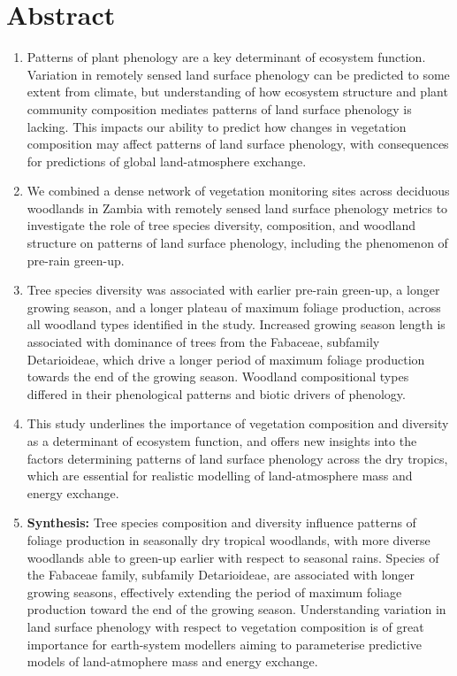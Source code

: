 \documentclass[11pt,a4paper]{article}
\begin{document}
\section*{Abstract}

\begin{enumerate}
	\item{Patterns of plant phenology are a key determinant of ecosystem function. Variation in remotely sensed land surface phenology can be predicted to some extent from climate, but understanding of how ecosystem structure and plant community composition mediates patterns of land surface phenology is lacking. This impacts our ability to predict how changes in vegetation composition may affect patterns of land surface phenology, with consequences for predictions of global land-atmosphere exchange.}
	\item{We combined a dense network of \nSites{} vegetation monitoring sites across deciduous woodlands in Zambia with remotely sensed land surface phenology metrics to investigate the role of tree species diversity, composition, and woodland structure on patterns of land surface phenology, including the phenomenon of pre-rain green-up.} 
	\item{Tree species diversity was associated with earlier pre-rain green-up, a longer growing season, and a longer plateau of maximum foliage production, across all woodland types identified in the study. Increased growing season length is associated with dominance of trees from the Fabaceae, subfamily Detarioideae, which drive a longer period of maximum foliage production towards the end of the growing season. Woodland compositional types differed in their phenological patterns and biotic drivers of phenology. }
	\item{This study underlines the importance of vegetation composition and diversity as a determinant of ecosystem function, and offers new insights into the factors determining patterns of land surface phenology across the dry tropics, which are essential for realistic modelling of land-atmosphere mass and energy exchange.}
	\item{\textbf{Synthesis:} Tree species composition and diversity influence patterns of foliage production in seasonally dry tropical woodlands, with more diverse woodlands able to green-up earlier with respect to seasonal rains. Species of the Fabaceae family, subfamily Detarioideae, are associated with longer growing seasons, effectively extending the period of maximum foliage production toward the end of the growing season. Understanding variation in land surface phenology with respect to vegetation composition is of great importance for earth-system modellers aiming to parameterise predictive models of land-atmophere mass and energy exchange.}
\end{enumerate}
\end{document}

